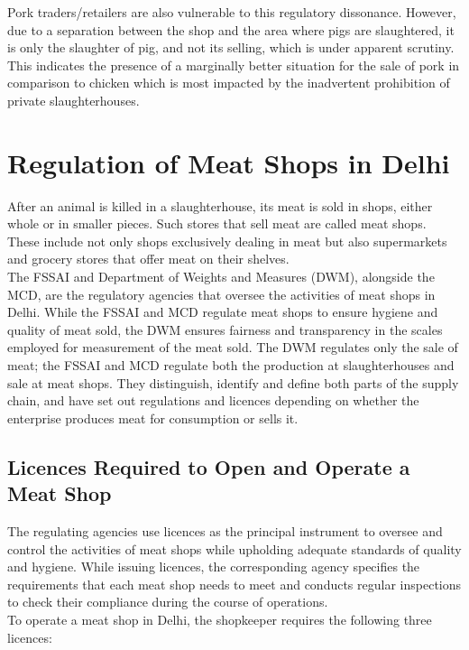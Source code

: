 \documentclass[a4paper, 12pt, twoside]{article}
\begin{document}
Pork traders/retailers are also vulnerable to this regulatory dissonance. However, due to a separation between the shop and the area where pigs are slaughtered, it is only the slaughter of pig, and not its selling, which is under apparent scrutiny. This indicates the presence of a marginally better situation for the sale of pork in comparison to chicken which is most impacted by the inadvertent prohibition of private slaughterhouses. 

\section{Regulation of Meat Shops in Delhi}

After an animal is killed in a slaughterhouse, its meat is sold in shops, either whole or in smaller pieces. Such stores that sell meat are called meat shops. These include not only shops exclusively dealing in meat but also supermarkets and grocery stores that offer meat on their shelves.\\

The FSSAI and Department of Weights and Measures (DWM), alongside the MCD, are the regulatory agencies that oversee the activities of meat shops in Delhi. While the FSSAI and MCD regulate meat shops to ensure hygiene and quality of meat sold, the DWM ensures fairness and transparency in the scales employed for measurement of the meat sold. The DWM regulates only the sale of meat; the FSSAI and MCD regulate both the production at slaughterhouses and sale at meat shops. They distinguish, identify and define both parts of the supply chain, and have set out regulations and licences depending on whether the enterprise produces meat for consumption or sells it. 

\subsection{Licences Required to Open and Operate a Meat Shop}

The regulating agencies use licences as the principal instrument to oversee and control the activities of meat shops while upholding adequate standards of quality and hygiene. While issuing licences, the corresponding agency specifies the requirements that each meat shop needs to meet and conducts regular inspections to check their compliance during the course of operations. \\

To operate a meat shop in Delhi, the shopkeeper requires the following three licences:
\end{document}
